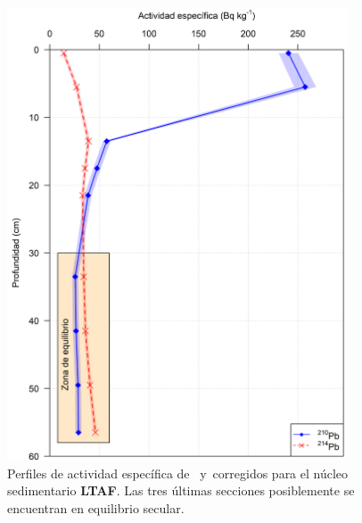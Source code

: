 \begin{figure}
\centering
\includegraphics[width=0.9\textwidth]{Imagenes/Act_210Pb_214Pb_LTAF.png}
\caption{Perfiles de actividad específica de \PbCero\, y \PbCuatro\,corregidos para el núcleo sedimentario \textbf{LTAF}. Las tres últimas secciones posiblemente se encuentran en equilibrio secular.}\label{Fig-LTAF-Comp}
\end{figure}
